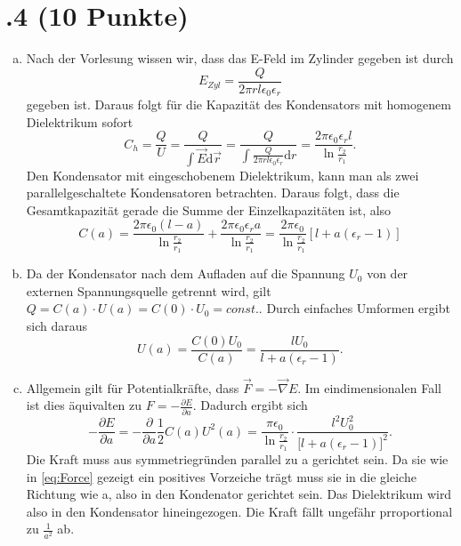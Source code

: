 \section*{\nr.4 \titfour (10 Punkte)}
\begin{enumerate}[(a)]
\item
Nach der Vorlesung wissen wir, dass das E-Feld im Zylinder gegeben ist durch
\begin{equation}
    E_{Zyl} = \frac{Q}{2 \pi r l \epsilon_{0} \epsilon_{r}}
\end{equation}
gegeben ist. Daraus folgt für die Kapazität des Kondensators mit homogenem Dielektrikum sofort
\begin{equation}
    C_{h}  = \frac{Q}{U} 
    = \frac{Q}{\int \vec{E} \mathrm{d} \vec{r}} 
    = \frac{Q}{\int \frac{Q}{2 \pi r l \epsilon_{0} \epsilon_{r}} \mathrm{d} r}
    = \frac{2 \pi \epsilon_{0} \epsilon_{r} l}{\ln \frac{r_{2}}{r_{1}}}.
\end{equation}
Den Kondensator mit eingeschobenem Dielektrikum, kann man als zwei parallelgeschaltete Kondensatoren betrachten. Daraus folgt, dass die Gesamtkapazität gerade die Summe der Einzelkapazitäten ist, also
\begin{equation}
    C(a) = \frac{2\pi \epsilon_{0} (l-a)}{\ln \frac{r_{2}}{r_{1}}} + \frac{2 \pi 
    \epsilon_{0} \epsilon_{r} a}{\ln \frac{r_{2}}{r_{1}}} 
    = \frac{2 \pi \epsilon_{0}}{\ln \frac{r_{2}}{r_{1}}} [ l + a(\epsilon_{r} - 1) ]
\end{equation}
\item
Da der Kondensator nach dem Aufladen auf die Spannung $U_{0}$ von der externen Spannungsquelle getrennt wird, gilt $Q = C(a) \cdot U(a) = C(0) \cdot U_{0} = const.$. Durch einfaches Umformen ergibt sich daraus
\begin{equation}
    U(a) = \frac{C(0) U_{0}}{C(a)} = \frac{l U_{0}}{l + a(\epsilon_{r} - 1)}.
\end{equation}
\item
Allgemein gilt für Potentialkräfte, dass $\vec{F} = -\vec{\nabla} E$. Im eindimensionalen Fall ist dies äquivalten zu $F = -\frac{\partial E}{\partial a}$. Dadurch ergibt sich
\begin{equation}
    -\frac{\partial E}{\partial a} = -\frac{\partial}{\partial a} \frac{1}{2}C(a) U^{2}(a)
    = \frac{\pi \epsilon_{0}}{\ln \frac{r_{2}}{r_{1}}} \cdot \frac{l^2 U_{0}^2}{\big[ l+a(\epsilon_{r}-1)\big]^2}.
    \label{eq:Force}
\end{equation}
Die Kraft muss aus symmetriegründen parallel zu a gerichtet sein. Da sie wie in \eqref{eq:Force} gezeigt ein positives Vorzeiche trägt muss sie in die gleiche Richtung wie a, also in den Kondenator gerichtet sein. Das Dielektrikum wird also in den Kondensator hineingezogen. Die Kraft fällt ungefähr prroportional zu $\frac{1}{a^2}$ ab.
\end{enumerate}
